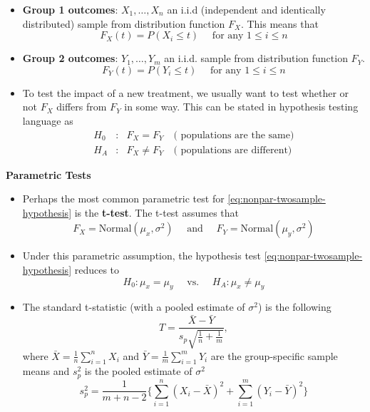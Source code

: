 \documentclass[]{book}
\begin{document}
\begin{itemize}
\item
  \textbf{Group 1 outcomes}: \(X_{1}, \ldots, X_{n}\) an i.i.d (independent and identically distributed) sample from distribution function \(F_{X}\).
  This means that
  \begin{equation}
  F_{X}(t) = P( X_{i} \leq t) \quad \textrm{ for any } 1 \leq i \leq n  \nonumber
  \end{equation}
\item
  \textbf{Group 2 outcomes}: \(Y_{1}, \ldots, Y_{m}\) an i.i.d. sample from distribution function \(F_{Y}\).
  \begin{equation}
  F_{Y}(t) = P( Y_{i} \leq t) \quad \textrm{ for any } 1 \leq i \leq n  \nonumber
  \end{equation}
\item
  To test the impact of a new treatment, we usually want to test whether or not \(F_{X}\) differs from \(F_{Y}\) in some way.
  This can be stated in hypothesis testing language as
  \begin{eqnarray}
  H_{0}&:& F_{X} = F_{Y} \quad \textrm{( populations are the same)} \nonumber \\
  H_{A}&:& F_{X} \neq F_{Y} \quad \textrm{( populations are different)} \label{eq:nonpar-twosample-hypothesis}
                                                                        \end{eqnarray}
\end{itemize}

\textbf{Parametric Tests}

\begin{itemize}
\item
  Perhaps the most common parametric test for \eqref{eq:nonpar-twosample-hypothesis} is the \textbf{t-test}. The t-test assumes that
  \begin{equation}
  F_{X} = \textrm{Normal}(\mu_{x}, \sigma^{2}) \quad \textrm{ and } \quad F_{Y} = \textrm{Normal}(\mu_{y}, \sigma^{2})
  \end{equation}
\item
  Under this parametric assumption, the hypothesis test \eqref{eq:nonpar-twosample-hypothesis} reduces to
  \begin{equation}
  H_{0}: \mu_{x} = \mu_{y}  \quad \textrm{ vs. } \quad H_{A}: \mu_{x} \neq \mu_{y}
  \end{equation}
\item
  The standard t-statistic (with a pooled estimate of \(\sigma^{2}\)) is the following
  \begin{equation}
  T = \frac{\bar{X} - \bar{Y}}{ s_{p}\sqrt{\frac{1}{n} + \frac{1}{m}}  },
  \end{equation}
  where \(\bar{X} = \frac{1}{n}\sum_{i=1}^{n} X_{i}\) and \(\bar{Y} = \frac{1}{m}\sum_{i=1}^{m} Y_{i}\) are
  the group-specific sample means and \(s_{p}^{2}\) is the pooled estimate of \(\sigma^{2}\)
  \begin{equation}
  s_{p}^{2} = \frac{1}{m + n - 2}\Big\{ \sum_{i=1}^{n} (X_{i} - \bar{X})^{2} + \sum_{i=1}^{m} (Y_{i} - \bar{Y})^{2}   \Big\}
  \end{equation}
\end{itemize}
\end{document}
